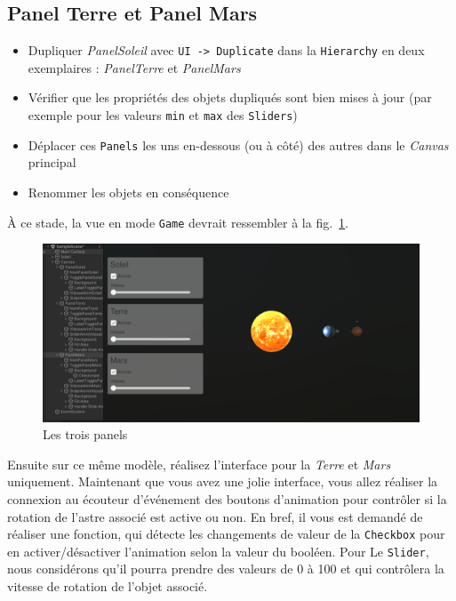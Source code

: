 \documentclass[a4paper,10pt]{article}
\newenvironment{solution}%
{\begin{tcolorbox}[breakable,colback=red!5!white,colframe=red!75!black,title=Solution]}%
{\end{tcolorbox}}
\begin{document}
\begin{solution}
\subsection{Panel Terre et Panel Mars}
\begin{itemize}
	\item Dupliquer \textit{PanelSoleil} avec \texttt{UI -> Duplicate} dans la \texttt{Hierarchy} en deux exemplaires : \textit{PanelTerre} et \textit{PanelMars}
	\item Vérifier que les propriétés des objets dupliqués sont bien mises à jour (par exemple pour les valeurs \texttt{min} et \texttt{max} des \texttt{Sliders})
	\item Déplacer ces \texttt{Panels} les uns en-dessous (ou à côté) des autres dans le \textit{Canvas} principal
	\item Renommer les objets en conséquence
\end{itemize}

À ce stade, la vue en mode \texttt{Game} devrait ressembler à la fig.~\ref{fig:trois-panels}.
\end{solution}

\newpage 
\begin{figure}[h]
		\begin{center}
			\includegraphics[scale=.50]{fig/trois-panels}
			\caption{Les trois panels}
			\label{fig:trois-panels}
		\end{center}
\end{figure}


\fi 


Ensuite sur ce même modèle, réalisez l'interface pour la \textit{Terre} et \textit{Mars} uniquement. Maintenant que vous avez une jolie interface, vous allez réaliser la connexion au écouteur d'événement des boutons d'animation pour contrôler si la rotation de l'astre associé est active ou non. En bref, il vous est demandé de réaliser une fonction, qui détecte les changements de valeur de la \texttt{Checkbox} pour en activer/désactiver l'animation selon la valeur du booléen. 
Pour Le \texttt{Slider}, nous considérons qu'il pourra prendre des valeurs de 0 à 100 et qui contrôlera la vitesse de rotation de l'objet associé.
\end{document}
